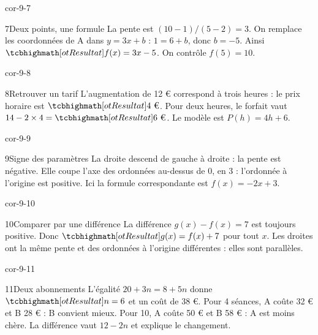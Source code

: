 \begin{blocLivre}{cor-9-7}\begin{corrige}{7}{Deux points, une formule}
La pente est $(10-1)/(5-2)=3$. On remplace les coordonnées de A dans $y=3x+b$ : $1=6+b$, donc $b=-5$. Ainsi $\res{f(x)=3x-5}$. On contrôle $f(5)=10$.
\label{fig-cor-9-7}
\end{corrige}\end{blocLivre}
\begin{blocLivre}{cor-9-8}\begin{corrige}{8}{Retrouver un tarif}
L’augmentation de 12 € correspond à trois heures : le prix horaire est $\res{4\text{ €}}$. Pour deux heures, le forfait vaut $14-2\times4=\res{6\text{ €}}$. Le modèle est $P(h)=4h+6$.
\end{corrige}\end{blocLivre}
\begin{blocLivre}{cor-9-9}\begin{corrige}{9}{Signe des paramètres}
La droite descend de gauche à droite : la pente est négative. Elle coupe l’axe des ordonnées au-dessus de 0, en 3 : l’ordonnée à l’origine est positive. Ici la formule correspondante est $f(x)=-2x+3$.
\label{fig-cor-9-9}
\end{corrige}\end{blocLivre}
\begin{blocLivre}{cor-9-10}\begin{corrige}{10}{Comparer par une différence}
La différence $g(x)-f(x)=7$ est toujours positive. Donc $\res{g(x)=f(x)+7}$ pour tout $x$. Les droites ont la même pente et des ordonnées à l’origine différentes : elles sont parallèles.
\label{fig-cor-9-10}
\end{corrige}\end{blocLivre}
\begin{blocLivre}{cor-9-11}\begin{corrige}{11}{Deux abonnements}
L’égalité $20+3n=8+5n$ donne $\res{n=6}$ et un coût de 38 €. Pour 4 séances, A coûte 32 € et B 28 € : B convient mieux. Pour 10, A coûte 50 € et B 58 € : A est moins chère. La différence vaut $12-2n$ et explique le changement.
\label{fig-cor-9-11}
\end{corrige}\end{blocLivre}

